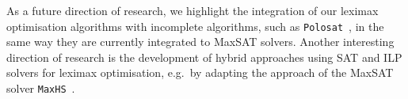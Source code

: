 \documentclass[a4paper,UKenglish,cleveref, autoref, thm-restate]{lipics-v2021}
\begin{document}
As a future direction of research, we highlight the integration of our leximax optimisation algorithms with incomplete algorithms, such as \texttt{Polosat}~\cite{DBLP:conf/fmcad/Nadel20a}, in the same way they are currently integrated to MaxSAT solvers.
Another interesting direction of research is the development of hybrid approaches using SAT and ILP solvers for leximax optimisation, e.g.\ by adapting the approach of the MaxSAT solver \texttt{MaxHS}~\cite{DBLP:conf/cp/DaviesB11}.
 

\end{document}
